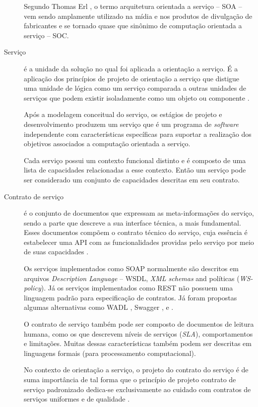 \begin{description}
Segundo Thomas Erl \cite{erl2009web}, o termo arquitetura orientada a serviço --
SOA -- vem sendo amplamente utilizado na mídia e nos produtos de divulgação de
fabricantes e se tornado quase que sinônimo de computação orientada a
serviço -- SOC.

\item [Serviço] é a unidade da solução no qual foi aplicada a orientação a
serviço. É a aplicação dos princípios de projeto de orientação a
serviço que distigue uma unidade de lógica como um serviço comparada a outras
unidades de serviços que podem existir isoladamente como um objeto ou
componente \cite{erl2009web}.

Após a modelagem conceitual do serviço, os estágios de projeto e desenvolvimento
produzem um serviço que é um programa de \textit{software} independente com
características específicas para suportar a realização dos objetivos associados
a computação orientada a serviço.

Cada serviço possui um contexto funcional distinto e é composto de uma lista
de capacidades relacionadas a esse contexto. Então um serviço pode ser
considerado um conjunto de capacidades descritas em seu contrato.


\item [Contrato de serviço] é o conjunto de documentos que expressam as
meta-informações do serviço, sendo a parte que descreve a
sua interface técnica, a mais fundamental. Esses documentos compõem o contrato
técnico do serviço, cuja essência é estabelecer uma API com as funcionalidades providas pelo serviço por meio de
suas capacidades \cite{erl2009web}.

Os serviços implementados como \ws{} SOAP normalmente são descritos em
arquivos \ws{} \textit{Description Language} -- WSDL, \textit{XML
schemas} and políticas (\textit{WS-policy}). Já os serviços implementados como \ws{} REST não
possuem uma linguagem padrão para especificação de contratos. Já foram propostas
algumas alternativas como WADL \cite{hadley2006web}, Swagger \cite{swaggerSite},
e \neoidl{} \cite{lima2015neoidl}.

O contrato de serviço também pode ser composto de documentos de leitura humana,
como os que descrevem níveis de serviços (\textit{SLA}), comportamentos e
limitações. Muitas dessas características também podem ser descritas em
linguagens formais (para processamento computacional).

No contexto de orientação a serviço, o projeto do contrato do serviço é de suma
importância de tal forma que o princípio de projeto contrato de serviço
padronizado dedica-se exclusivamente ao cuidado com contratos de serviços
uniformes e de qualidade \cite{erl2009web}.

\end{description}


